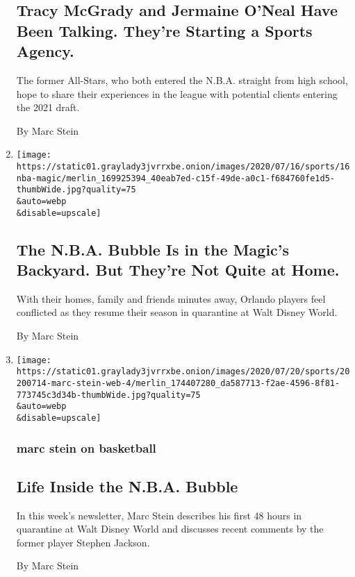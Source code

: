 \begin{enumerate}
  \hypertarget{tracy-mcgrady-and-jermaine-oneal-have-been-talking-theyre-starting-a-sports-agency}{%
  \subsection{Tracy McGrady and Jermaine O'Neal Have Been Talking.
  They're Starting a Sports
  Agency.}\label{tracy-mcgrady-and-jermaine-oneal-have-been-talking-theyre-starting-a-sports-agency}}

  The former All-Stars, who both entered the N.B.A. straight from high
  school, hope to share their experiences in the league with potential
  clients entering the 2021 draft.

  By Marc Stein
\item
  \href{/2020/07/17/sports/nba-bubble-orlando-magic.html}{}

  \texttt{[image: https://static01.graylady3jvrrxbe.onion/images/2020/07/16/sports/16nba-magic/merlin\_169925394\_40eab7ed-c15f-49de-a0c1-f684760fe1d5-thumbWide.jpg?quality=75\\\&auto=webp\\\&disable=upscale]}

  \hypertarget{the-nba-bubble-is-in-the-magics-backyard-but-theyre-not-quite-at-home}{%
  \subsection{The N.B.A. Bubble Is in the Magic's Backyard. But They're
  Not Quite at
  Home.}\label{the-nba-bubble-is-in-the-magics-backyard-but-theyre-not-quite-at-home}}

  With their homes, family and friends minutes away, Orlando players
  feel conflicted as they resume their season in quarantine at Walt
  Disney World.

  By Marc Stein
\item
  \href{/2020/07/15/sports/basketball/nba-bubble-orlando-stephen-jackson.html}{}

  \texttt{[image: https://static01.graylady3jvrrxbe.onion/images/2020/07/20/sports/20200714-marc-stein-web-4/merlin\_174407280\_da587713-f2ae-4596-8f81-773745c3d34b-thumbWide.jpg?quality=75\\\&auto=webp\\\&disable=upscale]}

  \hypertarget{marc-stein-on-basketball-2}{%
  \subsubsection{marc stein on
  basketball}\label{marc-stein-on-basketball-2}}

  \hypertarget{life-inside-the-nba-bubble-1}{%
  \subsection{Life Inside the N.B.A.
  Bubble}\label{life-inside-the-nba-bubble-1}}

  In this week's newsletter, Marc Stein describes his first 48 hours in
  quarantine at Walt Disney World and discusses recent comments by the
  former player Stephen Jackson.

  By Marc Stein
\end{enumerate}

